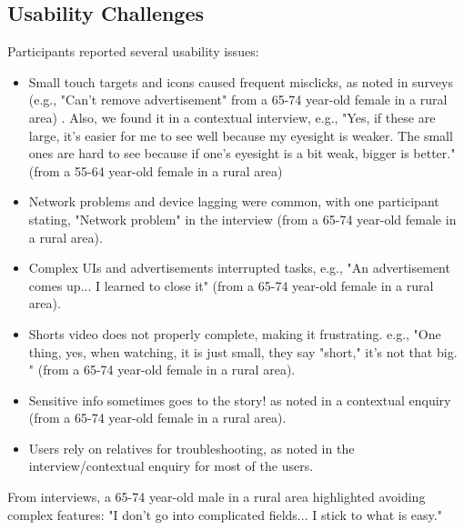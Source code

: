 \documentclass[acmlarge]{acmart}
\begin{document}
\subsection{Usability Challenges}
Participants reported several usability issues:
\begin{itemize}
    \item Small touch targets and icons caused frequent misclicks, as noted in surveys (e.g., "Can't remove advertisement" from a 65-74 year-old female in a rural area) \cite{tanaka2020mobileux, hanson2010age}.
 Also, we found it in a contextual interview, e.g., "Yes, if these are large, it's easier for me to see well because my eyesight is weaker. The small ones are hard to see because if one's eyesight is a bit weak, bigger is better." (from a 55-64 year-old female in a rural area) 
    \item Network problems and device lagging were common, with one participant stating, "Network problem" in the interview (from a 65-74 year-old female in a rural area).
    \item Complex UIs and advertisements interrupted tasks, e.g., "An advertisement comes up... I learned to close it" (from a 65-74 year-old female in a rural area).
    \item Shorts video does not properly complete, making it frustrating. e.g., "One thing, yes, when watching, it is just small, they say "short," it's not that big. " (from a 65-74 year-old female in a rural area).
    \item Sensitive info sometimes goes to the story! as noted in a contextual enquiry (from a 65-74 year-old female in a rural area).
    \item Users rely on relatives for troubleshooting, as noted in the interview/contextual enquiry for most of the users.
\end{itemize}
 
From interviews, a 65-74 year-old male in a rural area highlighted avoiding complex features: "I don't go into complicated fields... I stick to what is easy."
\end{document}
